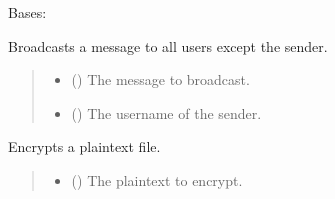 \documentclass[letterpaper,10pt,english]{sphinxmanual}
\begin{document}
\begin{fulllineitems}
\label{\detokenize{server1:server1.Server}}
\pysigstartsignatures
{}
\pysigstopsignatures
\sphinxAtStartPar
Bases: 

\begin{fulllineitems}
\label{\detokenize{server1:server1.Server.broadcast}}
\pysigstartsignatures
{}
\pysigstopsignatures
\sphinxAtStartPar
Broadcasts a message to all users except the sender.
\begin{quote}\begin{description}
\begin{itemize}
\item {} 
\sphinxAtStartPar
{} () \textendash{} The message to broadcast.

\item {} 
\sphinxAtStartPar
{} () \textendash{} The username of the sender.

\end{itemize}

\end{description}\end{quote}

\end{fulllineitems}


\begin{fulllineitems}
\label{\detokenize{server1:server1.Server.encrypt_file}}
\pysigstartsignatures
{}
\pysigstopsignatures
\sphinxAtStartPar
Encrypts a plaintext file.
\begin{quote}\begin{description}
\begin{itemize}
\item {} 
\sphinxAtStartPar
{} () \textendash{} The plaintext to encrypt.


\end{itemize}
\end{description}
\end{quote}
\end{fulllineitems}
\end{fulllineitems}
\end{document}
